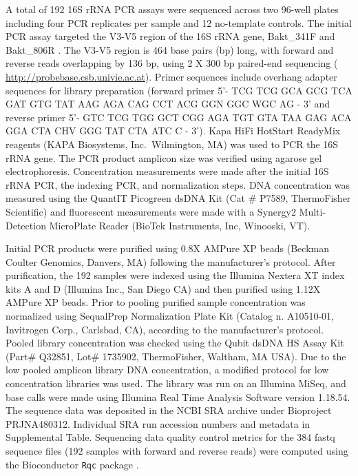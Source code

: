 \documentclass{bmcart}
\begin{document}
A total of 192 16S rRNA PCR assays were sequenced across two 96-well plates including four PCR replicates
per sample and 12 no-template controls. The initial
PCR assay targeted the V3-V5 region of the 16S rRNA gene, Bakt\_341F and
Bakt\_806R \cite{klindworth2012evaluation}. The V3-V5 region is 464
base pairs (bp) long, with forward and reverse reads overlapping by 136
bp, using 2 X 300 bp paired-end sequencing \cite{yang2016sensitivity} (
\url{http://probebase.csb.univie.ac.at}). Primer sequences include
overhang adapter sequences for library preparation (forward primer 5'-
TCG TCG GCA GCG TCA GAT GTG TAT AAG AGA CAG CCT ACG GGN GGC WGC AG - 3'
and reverse primer 5'- GTC TCG TGG GCT CGG AGA TGT GTA TAA GAG ACA GGA
CTA CHV GGG TAT CTA ATC C - 3'). Kapa HiFi HotStart
ReadyMix reagents (KAPA Biosystems, Inc.~Wilmington, MA) was used to PCR the 16S rRNA gene. The PCR product amplicon size
was verified using agarose gel electrophoresis.
Concentration measurements were made after the initial 16S rRNA PCR, the
indexing PCR, and normalization steps. DNA concentration was measured
using the QuantIT Picogreen dsDNA Kit (Cat \# P7589, ThermoFisher
Scientific) and fluorescent measurements were made with a Synergy2
Multi-Detection MicroPlate Reader (BioTek Instruments, Inc, Winooski,
VT).


Initial PCR products were purified using 0.8X AMPure XP beads (Beckman
Coulter Genomics, Danvers, MA) following the manufacturer's protocol.
After purification, the 192 samples were indexed using the Illumina
Nextera XT index kits A and D (Illumina Inc., San Diego CA) and then
purified using 1.12X AMPure XP beads. Prior to pooling purified sample
concentration was normalized using SequalPrep Normalization Plate Kit
(Catalog n. A10510-01, Invitrogen Corp., Carlsbad, CA), according to the
manufacturer's protocol. Pooled library concentration was checked using
the Qubit dsDNA HS Assay Kit (Part\# Q32851, Lot\# 1735902,
ThermoFisher, Waltham, MA USA). Due to the low pooled amplicon library
DNA concentration, a modified protocol for low concentration libraries
was used. The library was run on an Illumina MiSeq, and base calls were
made using Illumina Real Time Analysis Software version 1.18.54.
The sequence data was deposited in the NCBI SRA archive under Bioproject
PRJNA480312. Individual SRA run accession numbers and metadata in Supplemental Table.
Sequencing data quality control metrics for the 384 fastq sequence files
(192 samples with forward and reverse reads) were computed using the
Bioconductor \texttt{Rqc} package \cite{Rqc, Bioconductor}.
\end{document}
